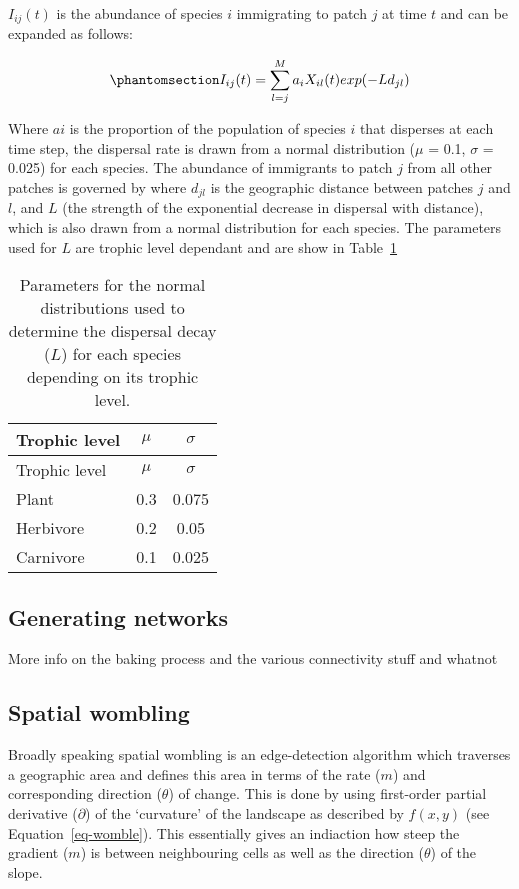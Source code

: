 \documentclass[
]{agujournal2019}
\begin{document}
\(I_{ij}(t)\) is the abundance of species \(i\) immigrating to patch
\(j\) at time \(t\) and can be expanded as follows:

\begin{equation}\phantomsection\label{eq-metacomm_imm}{
I_{ij}(t)=\sum_{l=j}^{M}a_iX_{il}(t)exp(-Ld_{jl})
}\end{equation}

Where \(ai\) is the proportion of the population of species \(i\) that
disperses at each time step, the dispersal rate is drawn from a normal
distribution (\(\mu\) = 0.1, \(\sigma\) = 0.025) for each species. The
abundance of immigrants to patch \(j\) from all other patches is
governed by where \(d_{jl}\) is the geographic distance between patches
\(j\) and \(l\), and \(L\) (the strength of the exponential decrease in
dispersal with distance), which is also drawn from a normal distribution
for each species. The parameters used for \(L\) are trophic level
dependant and are show in Table~\ref{tbl-interaction_decay}

\begin{longtable}[]{@{}lcc@{}}
\caption{Parameters for the normal distributions used to determine the
dispersal decay (\(L\)) for each species depending on its trophic
level.}\label{tbl-interaction_decay}\tabularnewline
\toprule\noalign{}
Trophic level & \(\mu\) & \(\sigma\) \\
\midrule\noalign{}
\endfirsthead
\toprule\noalign{}
Trophic level & \(\mu\) & \(\sigma\) \\
\midrule\noalign{}
\endhead
\bottomrule\noalign{}
\endlastfoot
Plant & 0.3 & 0.075 \\
Herbivore & 0.2 & 0.05 \\
Carnivore & 0.1 & 0.025 \\
\end{longtable}

\subsection{Generating networks}\label{generating-networks}

More info on the baking process and the various connectivity stuff and
whatnot

\subsection{Spatial wombling}\label{spatial-wombling}

Broadly speaking spatial wombling is an edge-detection algorithm which
traverses a geographic area and defines this area in terms of the rate
(\(m\)) and corresponding direction (\(\theta\)) of change. This is done
by using first-order partial derivative (\(\partial\)) of the
`curvature' of the landscape as described by \(f(x,y)\) (see
Equation~\ref{eq-womble}). This essentially gives an indiaction how
steep the gradient (\(m\)) is between neighbouring cells as well as the
direction (\(\theta\)) of the slope.
\end{document}

